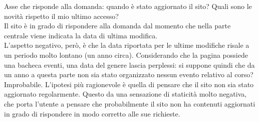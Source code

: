 Asse che risponde alla domanda: quando è stato aggiornato il sito? Quali sono le novità rispetto il mio ultimo accesso? \\
Il sito è in grado di rispondere alla domanda dal momento che nella parte centrale viene indicata la data di ultima modifica. \\
L'aspetto negativo, però, è che la data riportata per le ultime modifiche risale a un periodo molto lontano (un anno circa). Considerando che la pagina possiede una bacheca eventi, una data del genere lascia perplessi: si suppone quindi che da un anno a questa parte non sia stato organizzato nessun evento relativo al corso? Improbabile. L'ipotesi più ragionevole è quella di pensare che il sito non sia stato aggiornato regolarmente. Questo da una sensazione di staticità molto negativa, che porta l'utente a pensare che probabilmente il sito non ha contenuti aggiornati in grado di rispondere in modo corretto alle sue richieste.